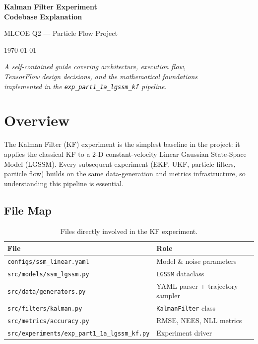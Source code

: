 \documentclass[11pt,a4paper]{article}
\newcommand{\py}[1]{\lstinline[style=py]{#1}}
\newcommand{\file}[1]{\texttt{#1}}
\begin{document}
\begin{titlepage}
\centering
\vspace*{4cm}
{\Huge\bfseries Kalman Filter Experiment\\[6pt]
Codebase Explanation\par}
\vspace{1.5cm}
{\Large MLCOE Q2 --- Particle Flow Project\par}
\vspace{2cm}
{\large\today\par}
\vfill
{\itshape A self-contained guide covering architecture, execution flow,\\
TensorFlow design decisions, and the mathematical foundations\\
implemented in the \texttt{exp\_part1\_1a\_lgssm\_kf} pipeline.\par}
\end{titlepage}

\tableofcontents
\newpage

\section{Overview}

The Kalman Filter (KF) experiment is the simplest baseline in the
project: it applies the classical KF to a 2-D constant-velocity
Linear Gaussian State-Space Model (LGSSM).  Every subsequent
experiment (EKF, UKF, particle filters, particle flow) builds on the
same data-generation and metrics infrastructure, so understanding this
pipeline is essential.

\subsection{File Map}

\begin{table}[h]
\centering
\begin{tabular}{@{}ll@{}}
\toprule
\textbf{File} & \textbf{Role} \\
\midrule
\file{configs/ssm\_linear.yaml}            & Model \& noise parameters          \\
\file{src/models/ssm\_lgssm.py}            & \py{LGSSM} dataclass               \\
\file{src/data/generators.py}              & YAML parser + trajectory sampler   \\
\file{src/filters/kalman.py}               & \py{KalmanFilter} class            \\
\file{src/metrics/accuracy.py}             & RMSE, NEES, NLL metrics            \\
\file{src/experiments/exp\_part1\_1a\_lgssm\_kf.py} & Experiment driver         \\
\bottomrule
\end{tabular}
\caption{Files directly involved in the KF experiment.}
\end{table}
\end{document}

